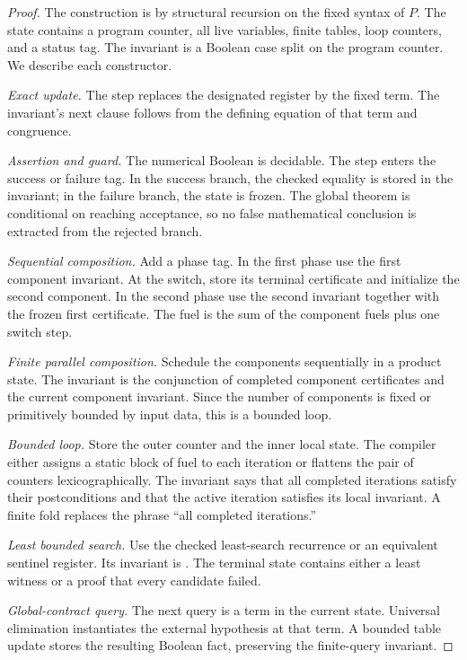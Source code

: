 \begin{proof}
The construction is by structural recursion on the fixed syntax of \(P\).  The state contains a program counter, all live variables, finite tables, loop counters, and a status tag.  The invariant is a Boolean case split on the program counter.  We describe each constructor.

\emph{Exact update.}  The step replaces the designated register by the fixed term.  The invariant's next clause follows from the defining equation of that term and congruence.

\emph{Assertion and guard.}  The numerical Boolean is decidable.  The step enters the success or failure tag.  In the success branch, the checked equality is stored in the invariant; in the failure branch, the state is frozen.  The global theorem is conditional on reaching acceptance, so no false mathematical conclusion is extracted from the rejected branch.

\emph{Sequential composition.}  Add a phase tag.  In the first phase use the first component invariant.  At the switch, store its terminal certificate and initialize the second component.  In the second phase use the second invariant together with the frozen first certificate.  The fuel is the sum of the component fuels plus one switch step.

\emph{Finite parallel composition.}  Schedule the components sequentially in a product state.  The invariant is the conjunction of completed component certificates and the current component invariant.  Since the number of components is fixed or primitively bounded by input data, this is a bounded loop.

\emph{Bounded loop.}  Store the outer counter and the inner local state.  The compiler either assigns a static block of fuel to each iteration or flattens the pair of counters lexicographically.  The invariant says that all completed iterations satisfy their postconditions and that the active iteration satisfies its local invariant.  A finite fold replaces the phrase ``all completed iterations.''

\emph{Least bounded search.}  Use the checked least-search recurrence or an equivalent sentinel register.  Its invariant is .  The terminal state contains either a least witness or a proof that every candidate failed.

\emph{Global-contract query.}  The next query is a term in the current state.  Universal elimination instantiates the external hypothesis at that term.  A bounded table update stores the resulting Boolean fact, preserving the finite-query invariant.


\end{proof}
